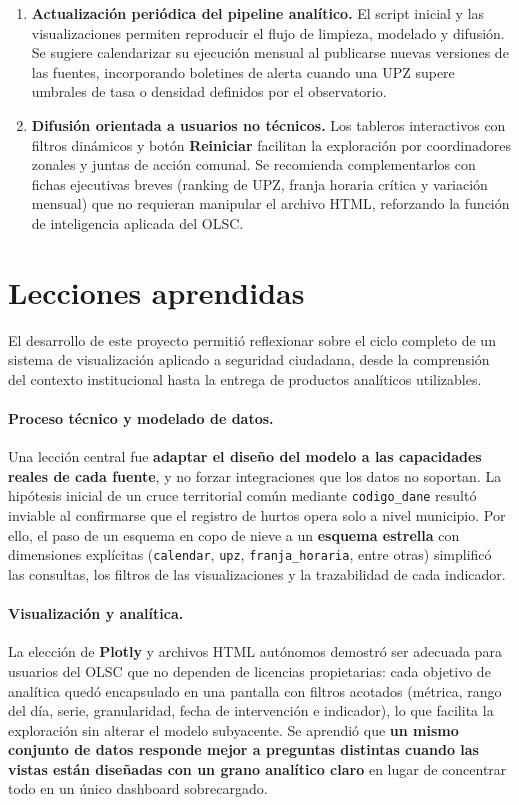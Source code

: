 \documentclass[12pt,letterpaper]{article}
\begin{document}
\begin{enumerate}
    \item \textbf{Actualización periódica del pipeline analítico.} El script inicial y las visualizaciones permiten reproducir el flujo de limpieza, modelado y difusión. Se sugiere calendarizar su ejecución mensual al publicarse nuevas versiones de las fuentes, incorporando boletines de alerta cuando una UPZ supere umbrales de tasa o densidad definidos por el observatorio.
    \item \textbf{Difusión orientada a usuarios no técnicos.} Los tableros interactivos con filtros dinámicos y botón \textbf{Reiniciar} facilitan la exploración por coordinadores zonales y juntas de acción comunal. Se recomienda complementarlos con fichas ejecutivas breves (ranking de UPZ, franja horaria crítica y variación mensual) que no requieran manipular el archivo HTML, reforzando la función de inteligencia aplicada del OLSC.
\end{enumerate}

\section{Lecciones aprendidas}

El desarrollo de este proyecto permitió reflexionar sobre el ciclo completo de un sistema de visualización aplicado a seguridad ciudadana, desde la comprensión del contexto institucional hasta la entrega de productos analíticos utilizables.

\paragraph{Proceso técnico y modelado de datos.}
Una lección central fue \textbf{adaptar el diseño del modelo a las capacidades reales de cada fuente}, y no forzar integraciones que los datos no soportan. La hipótesis inicial de un cruce territorial común mediante \texttt{codigo\_dane} resultó inviable al confirmarse que el registro de hurtos opera solo a nivel municipio. Por ello, el paso de un esquema en copo de nieve a un \textbf{esquema estrella} con dimensiones explícitas (\texttt{calendar}, \texttt{upz}, \texttt{franja\_horaria}, entre otras) simplificó las consultas, los filtros de las visualizaciones y la trazabilidad de cada indicador.

\paragraph{Visualización y analítica.}
La elección de \textbf{Plotly} y archivos HTML autónomos demostró ser adecuada para usuarios del OLSC que no dependen de licencias propietarias: cada objetivo de analítica quedó encapsulado en una pantalla con filtros acotados (métrica, rango del día, serie, granularidad, fecha de intervención e indicador), lo que facilita la exploración sin alterar el modelo subyacente. Se aprendió que \textbf{un mismo conjunto de datos responde mejor a preguntas distintas cuando las vistas están diseñadas con un grano analítico claro} en lugar de concentrar todo en un único dashboard sobrecargado.
\end{document}
